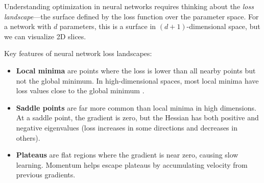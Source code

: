 Understanding optimization in neural networks requires thinking about the \emph{loss landscape}---the surface defined by the loss function over the parameter space. For a network with $d$ parameters, this is a surface in $(d+1)$-dimensional space, but we can visualize 2D slices.

\begin{center}
\end{center}

Key features of neural network loss landscapes:
\begin{itemize}[leftmargin=1.5em]
  \item \textbf{Local minima} are points where the loss is lower than all nearby points but not the global minimum. In high-dimensional spaces, most local minima have loss values close to the global minimum \citep{goodfellow2016}.
  \item \textbf{Saddle points} are far more common than local minima in high dimensions. At a saddle point, the gradient is zero, but the Hessian has both positive and negative eigenvalues (loss increases in some directions and decreases in others).
  \item \textbf{Plateaus} are flat regions where the gradient is near zero, causing slow learning. Momentum helps escape plateaus by accumulating velocity from previous gradients.
\end{itemize}


